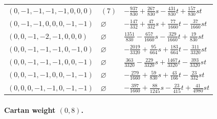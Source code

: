 \begin{longtable}{@{}lll@{}}
$(0,-1,-1,-1,-1,0,0,0)$ & $(7)$ & $-\frac{937}{830}+\allowbreak \frac{267}{830}s-\frac{431}{830}t+\allowbreak \frac{157}{830}st$\\
$(0,-1,-1,0,0,0,-1,-1)$ & $\varnothing$ & $-\frac{147}{332}+\allowbreak \frac{47}{332}s+\allowbreak \frac{77}{1660}t-\frac{37}{1660}st$\\
$(0,0,-1,-2,-1,0,0,0)$ & $\varnothing$ & $\frac{1351}{830}-\frac{657}{1660}s-\frac{329}{1660}t+\allowbreak \frac{19}{830}st$\\
$(0,0,-1,-1,-1,0,-1,0)$ & $\varnothing$ & $-\frac{2019}{3320}+\allowbreak \frac{95}{664}s+\allowbreak \frac{183}{664}t-\frac{311}{3320}st$\\
$(0,0,-1,-1,-1,0,0,-1)$ & $\varnothing$ & $\frac{363}{3320}-\frac{229}{3320}s+\allowbreak \frac{1467}{3320}t-\frac{393}{3320}st$\\
$(0,0,-1,-1,0,0,-1,-1)$ & $\varnothing$ & $-\frac{279}{1660}+\allowbreak \frac{59}{830}s+\allowbreak \frac{43}{166}t-\frac{23}{332}st$\\
$(0,0,0,-1,-1,0,-1,-1)$ & $\varnothing$ & $-\frac{397}{1660}+\allowbreak \frac{88}{1245}s-\frac{23}{415}t+\allowbreak \frac{41}{4980}st$\\
\end{longtable}
\endgroup
\paragraph{Cartan weight $(0,8)$.}

